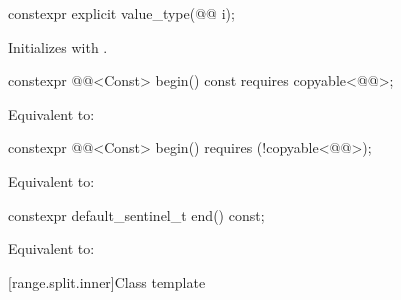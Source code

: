 %
\begin{itemdecl}
constexpr explicit value_type(@@ i);
\end{itemdecl}

\begin{itemdescr}
\pnum
\effects
Initializes  with .
\end{itemdescr}

%
\begin{itemdecl}
constexpr @@<Const> begin() const requires copyable<@@>;
\end{itemdecl}

\begin{itemdescr}
\pnum
\effects
Equivalent to: 
\end{itemdescr}

%
\begin{itemdecl}
constexpr @@<Const> begin() requires (!copyable<@@>);
\end{itemdecl}

\begin{itemdescr}
\pnum
\effects
Equivalent to: 
\end{itemdescr}
%
\begin{itemdecl}
constexpr default_sentinel_t end() const;
\end{itemdecl}

\begin{itemdescr}
\pnum
\effects
Equivalent to: 
\end{itemdescr}

[range.split.inner]{Class template }

